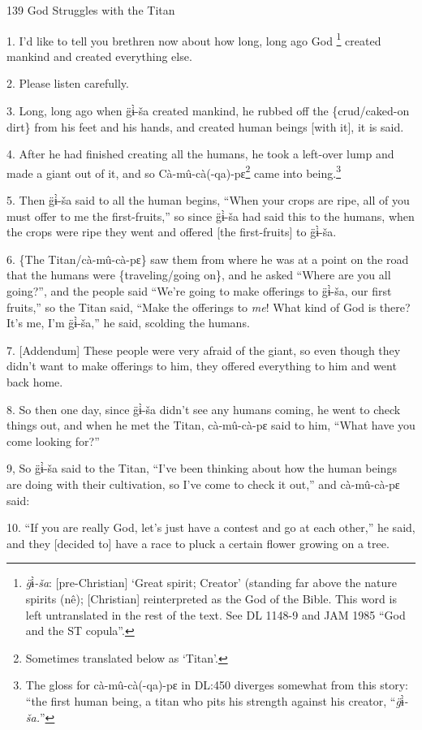 
139 God Struggles with the Titan

1. I'd like to tell you brethren now about how long, long ago God \footnote{\textit{g̈}ɨ̀\textit{-ša}: [pre-Christian] `Great spirit; Creator' (standing far above the nature spirits (nê); [Christian] reinterpreted as the God of the Bible. This word is left untranslated in the rest of the text. See DL 1148-9 and JAM 1985 ``God and the ST copula''.} created mankind
and created everything else.

2. Please listen carefully.

3. Long, long ago when g̈ɨ̀-ša created mankind, he rubbed off the \{crud/caked-on
dirt\} from his  feet and his hands, and created human beings [with it], it is
said.

4. After he had finished creating all the humans, he took a left-over lump and
made a giant out of it, and so Cà-mû-cà(-qa)-pɛ\footnote{Sometimes translated below as `Titan'.} came into being.\footnote{The gloss for cà-mû-cà(-qa)-pɛ in DL:450 diverges somewhat from this story: ``the first human being, a titan who pits his strength against his creator, ``\textit{g̈}ɨ̀\textit{-ša.}''}

5. Then g̈ɨ̀-ša said to all the human begins, ``When your crops are ripe, all
of you must offer to me the first-fruits,'' so since g̈ɨ̀-ša had said this
to the humans, when the crops were ripe they went and offered [the first-fruits]
to g̈ɨ̀-ša.

6. \{The Titan/cà-mû-cà-pɛ\} saw them from where he was at a point on the road
that the humans were \{traveling/going on\}, and he asked ``Where are you all going?'',
and the people said ``We're going to make offerings to g̈ɨ̀-ša, our first fruits,''
so the Titan said, ``Make the offerings to \textit{me}! What kind of God is there?
It's me, I'm g̈ɨ̀-ša,'' he said, scolding the humans.

7. [Addendum] These people were very afraid of the giant, so even though they didn't
want to make offerings to him, they offered everything to him and went back home.

8. So then one day, since g̈ɨ̀-ša didn't see any humans coming, he went to
check things out, and when he met the Titan, cà-mû-cà-pɛ said to him, ``What
have you come looking for?''

9, So g̈ɨ̀-ša said to the Titan, ``I've been thinking about how the human beings
are doing with their cultivation, so I've come to check it out,'' and cà-mû-cà-pɛ
said:

10. ``If you are really God, let's just have a contest and go at each other,''
he said, and they [decided to] have a race to pluck a certain flower growing on
a tree.


